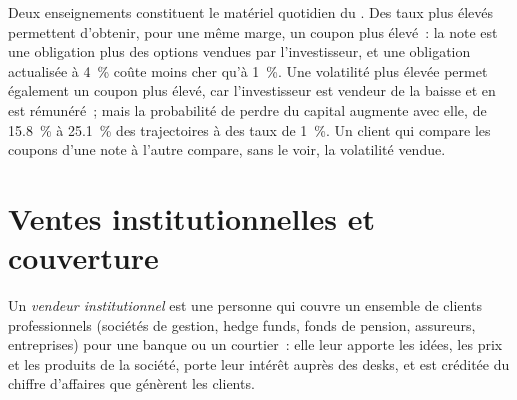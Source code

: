 Deux enseignements constituent le matériel quotidien du . Des taux plus élevés permettent d'obtenir, pour une même marge, un coupon plus élevé~: la note est
une obligation plus des options vendues par l'investisseur, et une obligation actualisée à 4~\% coûte moins cher qu'à 1~\%. Une volatilité plus élevée permet
également un coupon plus élevé, car l'investisseur est vendeur de la baisse et en est rémunéré~; mais la probabilité de perdre du capital augmente
avec elle, de 15.8~\% à 25.1~\% des trajectoires à des taux de 1~\%. Un client qui compare les coupons d'une note à l'autre compare,
sans le voir, la volatilité vendue.

\begin{omfigure}

\label{fig:in:structurer-sales-and-sales-trader:coupon}
\end{omfigure}

\section{Ventes institutionnelles et couverture}

\begin{definition}\label{def:in:structurer-sales-and-sales-trader:sales}
Un \emph{vendeur institutionnel} est une personne qui couvre un ensemble de
clients professionnels (sociétés de gestion, hedge funds, fonds de pension, assureurs, entreprises) pour une banque ou un courtier~: elle leur apporte les
idées, les prix et les produits de la société, porte leur intérêt auprès des desks, et est créditée du chiffre d'affaires que génèrent les clients.
\end{definition}

